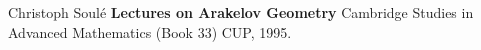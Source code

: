 \documentclass[12pt]{article}
\begin{document}
\newpage



\selectfont \fontsize{12}{10}\selectfont

\begin{thebibliography}{}

\item Christoph Soul\'{e} \textbf{Lectures on Arakelov Geometry} Cambridge Studies in Advanced Mathematics (Book 33) CUP, 1995.

\end{thebibliography}
\end{document}
